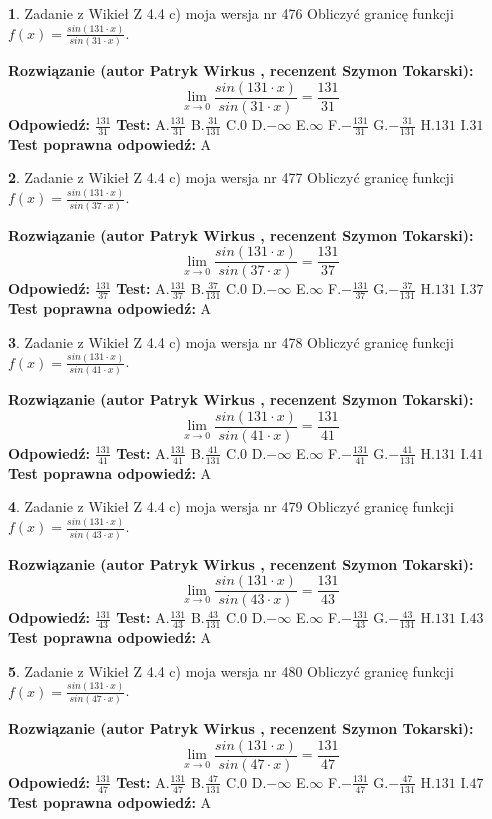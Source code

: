 \documentclass[12pt, a4paper]{article}
\theoremstyle{definition} %
\newtheorem{zad}{}
\newcommand{\zadStart}[1]{\begin{zad}#1\newline}
\newcommand{\zadStop}{\end{zad}}
\newcommand{\rozwStart}[2]{\noindent \textbf{Rozwiązanie (autor #1 , recenzent #2): }\newline}
\newcommand{\rozwStop}{\newline}
\newcommand{\odpStart}{\noindent \textbf{Odpowiedź:}\newline}
\newcommand{\odpStop}{\newline}
\newcommand{\testStart}{\noindent \textbf{Test:}\newline}
\newcommand{\testStop}{\newline}
\newcommand{\kluczStart}{\noindent \textbf{Test poprawna odpowiedź:}\newline}
\newcommand{\kluczStop}{\newline}
\begin{document}
\zadStart{Zadanie z Wikieł Z 4.4 c) moja wersja nr 476}
Obliczyć granicę funkcji $f(x)=\frac{sin(131\cdot x)}{sin(31\cdot x)}$.
\zadStop
\rozwStart{Patryk Wirkus}{Szymon Tokarski}
$$\lim\limits_{x\to 0}\frac{sin(131\cdot x)}{sin(31\cdot x)}=
\frac{131}{31}$$
\rozwStop
\odpStart
$\frac{131}{31}$
\odpStop
\testStart
A.$\frac{131}{31}$
B.$\frac{31}{131}$
C.$0$
D.$-\infty$
E.$\infty$
F.$-\frac{131}{31}$
G.$-\frac{31}{131}$
H.$131$
I.$31$
\testStop
\kluczStart
A
\kluczStop



\zadStart{Zadanie z Wikieł Z 4.4 c) moja wersja nr 477}
Obliczyć granicę funkcji $f(x)=\frac{sin(131\cdot x)}{sin(37\cdot x)}$.
\zadStop
\rozwStart{Patryk Wirkus}{Szymon Tokarski}
$$\lim\limits_{x\to 0}\frac{sin(131\cdot x)}{sin(37\cdot x)}=
\frac{131}{37}$$
\rozwStop
\odpStart
$\frac{131}{37}$
\odpStop
\testStart
A.$\frac{131}{37}$
B.$\frac{37}{131}$
C.$0$
D.$-\infty$
E.$\infty$
F.$-\frac{131}{37}$
G.$-\frac{37}{131}$
H.$131$
I.$37$
\testStop
\kluczStart
A
\kluczStop



\zadStart{Zadanie z Wikieł Z 4.4 c) moja wersja nr 478}
Obliczyć granicę funkcji $f(x)=\frac{sin(131\cdot x)}{sin(41\cdot x)}$.
\zadStop
\rozwStart{Patryk Wirkus}{Szymon Tokarski}
$$\lim\limits_{x\to 0}\frac{sin(131\cdot x)}{sin(41\cdot x)}=
\frac{131}{41}$$
\rozwStop
\odpStart
$\frac{131}{41}$
\odpStop
\testStart
A.$\frac{131}{41}$
B.$\frac{41}{131}$
C.$0$
D.$-\infty$
E.$\infty$
F.$-\frac{131}{41}$
G.$-\frac{41}{131}$
H.$131$
I.$41$
\testStop
\kluczStart
A
\kluczStop



\zadStart{Zadanie z Wikieł Z 4.4 c) moja wersja nr 479}
Obliczyć granicę funkcji $f(x)=\frac{sin(131\cdot x)}{sin(43\cdot x)}$.
\zadStop
\rozwStart{Patryk Wirkus}{Szymon Tokarski}
$$\lim\limits_{x\to 0}\frac{sin(131\cdot x)}{sin(43\cdot x)}=
\frac{131}{43}$$
\rozwStop
\odpStart
$\frac{131}{43}$
\odpStop
\testStart
A.$\frac{131}{43}$
B.$\frac{43}{131}$
C.$0$
D.$-\infty$
E.$\infty$
F.$-\frac{131}{43}$
G.$-\frac{43}{131}$
H.$131$
I.$43$
\testStop
\kluczStart
A
\kluczStop



\zadStart{Zadanie z Wikieł Z 4.4 c) moja wersja nr 480}
Obliczyć granicę funkcji $f(x)=\frac{sin(131\cdot x)}{sin(47\cdot x)}$.
\zadStop
\rozwStart{Patryk Wirkus}{Szymon Tokarski}
$$\lim\limits_{x\to 0}\frac{sin(131\cdot x)}{sin(47\cdot x)}=
\frac{131}{47}$$
\rozwStop
\odpStart
$\frac{131}{47}$
\odpStop
\testStart
A.$\frac{131}{47}$
B.$\frac{47}{131}$
C.$0$
D.$-\infty$
E.$\infty$
F.$-\frac{131}{47}$
G.$-\frac{47}{131}$
H.$131$
I.$47$
\testStop
\kluczStart
A
\kluczStop
\end{document}
